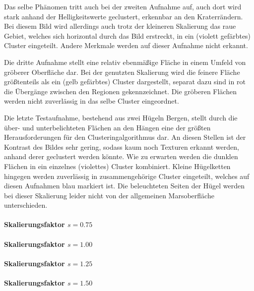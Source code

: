 Das selbe Phänomen tritt auch bei der zweiten Aufnahme auf, auch dort wird stark anhand der Helligkeitswerte geclustert, erkennbar an den Kraterrändern. Bei diesem Bild wird allerdings auch trotz der kleineren Skalierung das raue Gebiet, welches sich horizontal durch das Bild erstreckt, in ein (violett gefärbtes) Cluster eingeteilt. Andere Merkmale werden auf dieser Aufnahme nicht erkannt.

Die dritte Aufnahme stellt eine relativ ebenmäßige Fläche in einem Umfeld von gröberer Oberfläche dar. Bei der genutzten Skalierung wird die feinere Fläche größtenteils als ein (gelb gefärbtes) Cluster dargestellt, separat dazu sind in rot die Übergänge zwischen den Regionen gekennzeichnet. Die gröberen Flächen werden nicht zuverlässig in das selbe Cluster eingeordnet.

Die letzte Testaufnahme, bestehend aus zwei Hügeln \bzw Bergen, stellt durch die über- und unterbelichteten Flächen an den Hängen eine der größten Herausforderungen für den Clusteringalgorithmus dar. An diesen Stellen ist der Kontrast des Bildes sehr gering, sodass kaum noch Texturen erkannt werden, anhand derer geclustert werden könnte. Wie zu erwarten werden die dunklen Flächen in ein einzelnes (violettes) Cluster kombiniert. Kleine Hügelketten hingegen werden zuverlässig in zusammengehörige Cluster eingeteilt, welches auf diesen Aufnahmen blau markiert ist. Die beleuchteten Seiten der Hügel werden bei dieser Skalierung leider nicht von der allgemeinen Marsoberfläche unterschieden.
\paragraph{Skalierungsfaktor $s=0.75$}

\paragraph{Skalierungsfaktor $s=1.00$}

\paragraph{Skalierungsfaktor $s=1.25$}

\paragraph{Skalierungsfaktor $s=1.50$}

